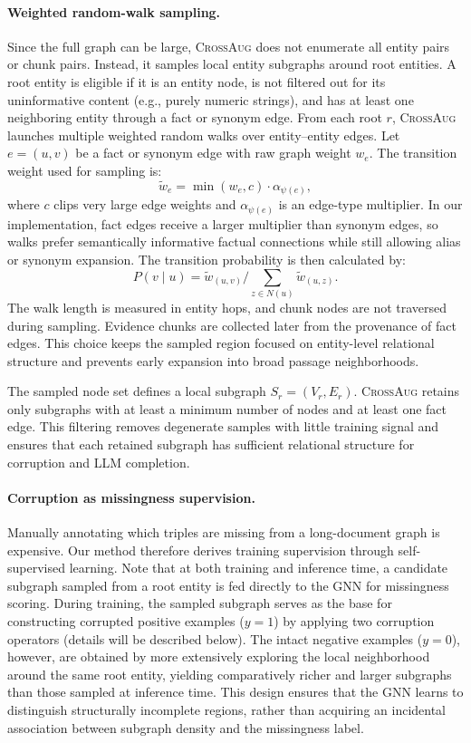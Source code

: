 \documentclass[11pt]{article}
\newcommand{\ours}{\textsc{CrossAug}\xspace}
\begin{document}
\paragraph{Weighted random-walk sampling.}
Since the full graph can be large, \ours does not enumerate all entity pairs or chunk pairs. Instead, it samples local entity subgraphs around root entities. A root entity is eligible if it is an entity node, {is not filtered out for its uninformative content (e.g., purely numeric strings)}, and has at least one neighboring entity through a fact or synonym edge. From each root $r$, \ours launches multiple weighted random walks over {entity--entity} edges. Let $e=(u,v)$ be a fact or synonym edge with raw graph weight $w_e$. The transition weight used for sampling is:
\[
\tilde{w}_e = \min(w_e,c)\cdot \alpha_{\psi(e)},
\]
where $c$ clips very large edge weights and $\alpha_{\psi(e)}$ is an edge-type multiplier. In our implementation, fact edges receive a larger multiplier than synonym edges, so walks prefer semantically informative factual connections while still allowing alias or synonym expansion. The transition probability is then calculated by:
\[
P(v\mid u)=\tilde{w}_{(u,v)} / \sum_{z\in N(u)}\tilde{w}_{(u,z)}.
\]
The walk length is measured in entity hops, and chunk nodes are not traversed during sampling. Evidence chunks are collected later from the provenance of fact edges. This choice keeps the sampled region focused on entity-level relational structure and prevents early expansion into broad passage neighborhoods.

The sampled node set defines a local subgraph $S_r=(V_r,E_r)$. \ours retains only subgraphs with at least a minimum number of nodes and at least one fact edge. This filtering removes degenerate samples with little training signal and ensures that each retained subgraph has sufficient relational structure for corruption and LLM completion.
\paragraph{Corruption as missingness supervision.}
Manually annotating which triples are missing from a long-document graph is expensive. 
Our method therefore derives training supervision through self-supervised learning. 
Note that at both training  and inference time, 
a candidate subgraph sampled from a root entity is fed directly to the GNN for missingness scoring. 
During training, the sampled subgraph serves as the base for constructing corrupted positive examples ($y=1$) by applying two corruption operators (details will be described below). 
The intact negative examples ($y=0$), however, are obtained by more extensively exploring the local neighborhood around the same root entity, yielding comparatively richer and larger subgraphs than those sampled at inference time. 
This design ensures that the GNN learns to distinguish structurally incomplete regions, 
rather than acquiring an incidental association between subgraph density and the missingness label.
\end{document}
